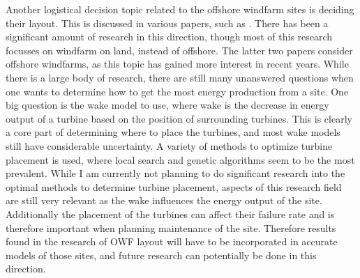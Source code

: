 \documentclass[a4paper,12pt]{article}
\begin{document}
Another logistical decision topic related to the offshore windfarm sites is deciding their layout. This is discussed in various papers, such as \cite{mosetti1994optimization, kusiak2010design, saavedra2011seeding, perez2013offshore, hou2017combined}. There has been a significant amount of research in this direction, though most of this research focusses on windfarm on land, instead of offshore. The latter two papers \cite{perez2013offshore, hou2017combined} consider offshore windfarms, as this topic has gained more interest in recent years. While there is a large body of research, there are still many unanswered questions when one wants to determine how to get the most energy production from a site. One big question is the wake model to use, where wake is the decrease in energy output of a turbine based on the position of surrounding turbines. This is clearly a core part of determining where to place the turbines, and most wake models still have considerable uncertainty. A variety of methods to optimize turbine placement is used, where local search and genetic algorithms seem to be the most prevalent. While I am currently not planning to do significant research into the optimal methods to determine turbine placement, aspects of this research field are still very relevant as the wake influences the energy output of the site. Additionally the placement of the turbines can affect their failure rate and is therefore important when planning maintenance of the site. Therefore results found in the research of OWF layout will have to be incorporated in accurate models of those sites, and future research can potentially be done in this direction.

\end{document}
